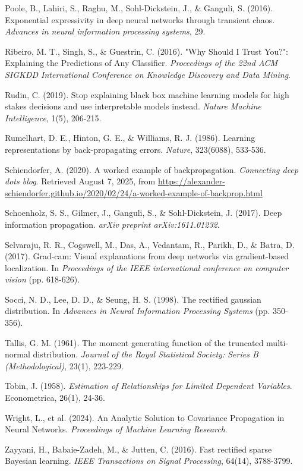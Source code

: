 \begin{thebibliography}{99}
Poole, B., Lahiri, S., Raghu, M., Sohl-Dickstein, J., \& Ganguli, S. (2016). Exponential expressivity in deep neural networks through transient chaos. \textit{Advances in neural information processing systems}, 29.

Ribeiro, M. T., Singh, S., \& Guestrin, C. (2016). "Why Should I Trust You?": Explaining the Predictions of Any Classifier. \textit{Proceedings of the 22nd ACM SIGKDD International Conference on Knowledge Discovery and Data Mining}.

Rudin, C. (2019). Stop explaining black box machine learning models for high stakes decisions and use interpretable models instead. \textit{Nature Machine Intelligence}, 1(5), 206-215.

Rumelhart, D. E., Hinton, G. E., \& Williams, R. J. (1986). Learning representations by back-propagating errors. \textit{Nature}, 323(6088), 533-536.

Schiendorfer, A. (2020). A worked example of backpropagation. \textit{Connecting deep dots blog}. Retrieved August 7, 2025, from \url{https://alexander-schiendorfer.github.io/2020/02/24/a-worked-example-of-backprop.html}

Schoenholz, S. S., Gilmer, J., Ganguli, S., \& Sohl-Dickstein, J. (2017). Deep information propagation. \textit{arXiv preprint arXiv:1611.01232}.

Selvaraju, R. R., Cogswell, M., Das, A., Vedantam, R., Parikh, D., \& Batra, D. (2017). Grad-cam: Visual explanations from deep networks via gradient-based localization. In \textit{Proceedings of the IEEE international conference on computer vision} (pp. 618-626).

Socci, N. D., Lee, D. D., \& Seung, H. S. (1998). The rectified gaussian distribution. In \textit{Advances in Neural Information Processing Systems} (pp. 350-356).

Tallis, G. M. (1961). The moment generating function of the truncated multi-normal distribution. \textit{Journal of the Royal Statistical Society: Series B (Methodological)}, 23(1), 223-229.

Tobin, J. (1958). \textit{Estimation of Relationships for Limited Dependent Variables}. Econometrica, 26(1), 24-36.

Wright, L., et al. (2024). An Analytic Solution to Covariance Propagation in Neural Networks. \textit{Proceedings of Machine Learning Research}.

Zayyani, H., Babaie-Zadeh, M., \& Jutten, C. (2016). Fast rectified sparse Bayesian learning. \textit{IEEE Transactions on Signal Processing}, 64(14), 3788-3799.

\end{thebibliography}
